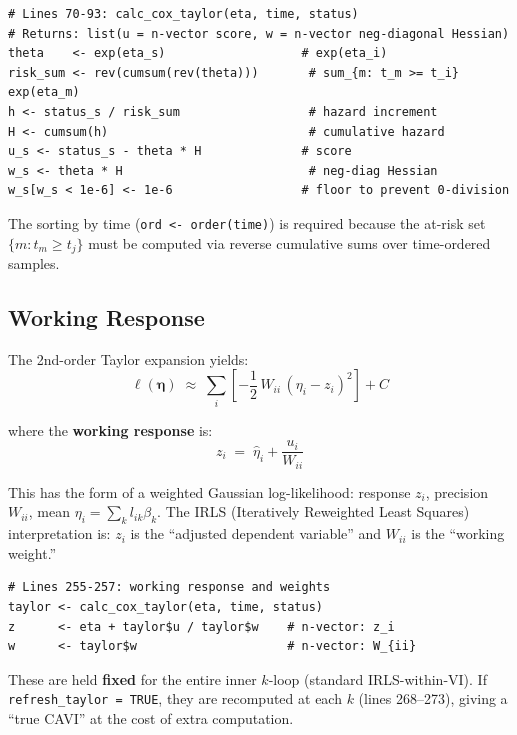 \documentclass[11pt]{article}
\newcommand{\coderef}[1]{{\color{blue!70!black}\texttt{#1}}}
\begin{document}
\begin{codebox}
\begin{lstlisting}[style=Rstyle]
# Lines 70-93: calc_cox_taylor(eta, time, status)
# Returns: list(u = n-vector score, w = n-vector neg-diagonal Hessian)
theta    <- exp(eta_s)                   # exp(eta_i)
risk_sum <- rev(cumsum(rev(theta)))       # sum_{m: t_m >= t_i} exp(eta_m)
h <- status_s / risk_sum                  # hazard increment
H <- cumsum(h)                            # cumulative hazard
u_s <- status_s - theta * H              # score
w_s <- theta * H                          # neg-diag Hessian
w_s[w_s < 1e-6] <- 1e-6                  # floor to prevent 0-division
\end{lstlisting}
The sorting by time (\coderef{ord <- order(time)}) is required because the
at-risk set $\{m : t_m \ge t_j\}$ must be computed via reverse cumulative
sums over time-ordered samples.
\end{codebox}

\subsection{Working Response}

The 2nd-order Taylor expansion yields:
\begin{equation}\label{eq:taylor-quad}
  \ell(\bm{\eta}) \;\approx\;
  \sum_i \left[-\frac{1}{2}\,W_{ii}\,(\eta_i - z_i)^2\right] + C
\end{equation}

where the \textbf{working response} is:
\begin{equation}\label{eq:working-response}
  \boxed{z_i \;=\; \hat{\eta}_i + \frac{u_i}{W_{ii}}}
\end{equation}

This has the form of a weighted Gaussian log-likelihood: response $z_i$,
precision $W_{ii}$, mean $\eta_i = \sum_k l_{ik}\beta_k$.  The IRLS
(Iteratively Reweighted Least Squares) interpretation is: $z_i$ is the
``adjusted dependent variable'' and $W_{ii}$ is the ``working weight.''

\begin{codebox}
\begin{lstlisting}[style=Rstyle]
# Lines 255-257: working response and weights
taylor <- calc_cox_taylor(eta, time, status)
z      <- eta + taylor$u / taylor$w    # n-vector: z_i
w      <- taylor$w                     # n-vector: W_{ii}
\end{lstlisting}
These are held \textbf{fixed} for the entire inner $k$-loop (standard
IRLS-within-VI).  If \coderef{refresh\_taylor = TRUE}, they are recomputed
at each $k$ (lines 268--273), giving a ``true CAVI'' at the cost of extra
computation.
\end{codebox}
\end{document}
